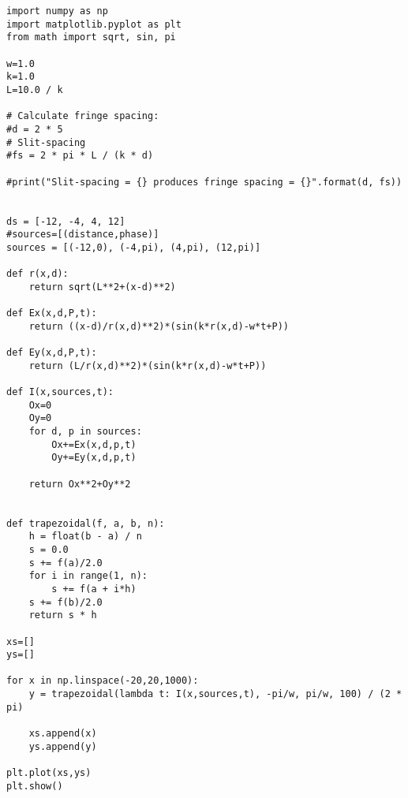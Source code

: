 \begin{Verbatim}[fontsize=\small,baselinestretch=0.9]
import numpy as np
import matplotlib.pyplot as plt
from math import sqrt, sin, pi

w=1.0
k=1.0
L=10.0 / k

# Calculate fringe spacing:
#d = 2 * 5           
# Slit-spacing
#fs = 2 * pi * L / (k * d)

#print("Slit-spacing = {} produces fringe spacing = {}".format(d, fs))


ds = [-12, -4, 4, 12]
#sources=[(distance,phase)]
sources = [(-12,0), (-4,pi), (4,pi), (12,pi)]

def r(x,d):
    return sqrt(L**2+(x-d)**2)
    
def Ex(x,d,P,t):
    return ((x-d)/r(x,d)**2)*(sin(k*r(x,d)-w*t+P))
   
def Ey(x,d,P,t):
    return (L/r(x,d)**2)*(sin(k*r(x,d)-w*t+P))
       
def I(x,sources,t):
    Ox=0
    Oy=0
    for d, p in sources:
        Ox+=Ex(x,d,p,t)
        Oy+=Ey(x,d,p,t)
    
    return Ox**2+Oy**2
        
    
def trapezoidal(f, a, b, n):
    h = float(b - a) / n
    s = 0.0
    s += f(a)/2.0
    for i in range(1, n):
        s += f(a + i*h)
    s += f(b)/2.0
    return s * h

xs=[]
ys=[]

for x in np.linspace(-20,20,1000):
    y = trapezoidal(lambda t: I(x,sources,t), -pi/w, pi/w, 100) / (2 * pi)
   
    xs.append(x)
    ys.append(y)

plt.plot(xs,ys)
plt.show()
\end{Verbatim}
